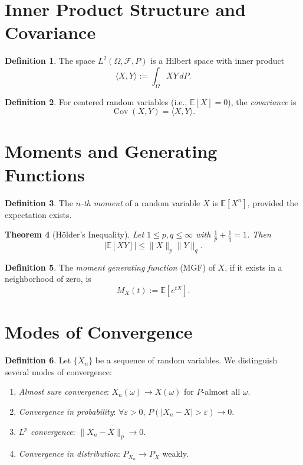 \documentclass[11pt]{amsart}
\newtheorem{theorem}{Theorem}[section]
\theoremstyle{definition}
\newtheorem{definition}[theorem]{Definition}
\theoremstyle{remark}
\begin{document}
\section{Inner Product Structure and Covariance}

\begin{definition}
The space $L^2(\Omega, \mathcal{F}, P)$ is a Hilbert space with inner product
\[
\langle X, Y \rangle := \int_\Omega X Y \, dP.
\]
\end{definition}

\begin{definition}
For centered random variables (i.e., $\mathbb{E}[X]=0$), the \emph{covariance} is
\[
\operatorname{Cov}(X, Y) = \langle X, Y \rangle.
\]
\end{definition}

\section{Moments and Generating Functions}

\begin{definition}
The \emph{$n$-th moment} of a random variable $X$ is $\mathbb{E}[X^n]$, provided the expectation exists.
\end{definition}

\begin{theorem}[Hölder's Inequality]
Let $1 \leq p, q \leq \infty$ with $\frac{1}{p} + \frac{1}{q} = 1$. Then
\[
|\mathbb{E}[XY]| \leq \|X\|_p \|Y\|_q.
\]
\end{theorem}

\begin{definition}
The \emph{moment generating function} (MGF) of $X$, if it exists in a neighborhood of zero, is
\[
M_X(t) := \mathbb{E}[e^{tX}].
\]
\end{definition}

\section{Modes of Convergence}

\begin{definition}
Let $\{X_n\}$ be a sequence of random variables. We distinguish several modes of convergence:
\begin{enumerate}[label=(\roman*)]
\item \emph{Almost sure convergence}: $X_n(\omega) \to X(\omega)$ for $P$-almost all $\omega$.
\item \emph{Convergence in probability}: $\forall \varepsilon>0$, $P(|X_n - X| > \varepsilon) \to 0$.
\item \emph{$L^p$ convergence}: $\|X_n - X\|_p \to 0$.
\item \emph{Convergence in distribution}: $P_{X_n} \to P_X$ weakly.
\end{enumerate}
\end{definition}
\end{document}
